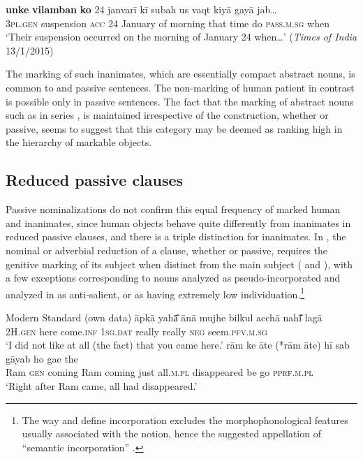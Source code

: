 \documentclass[output=paper]{LSP/langsci}
\begin{document}
\ex
\gll \textbf{unke} \textbf{vilamban} \textbf{ko} 24 janvarī kī subah us vaqt kiyā gayā jab…\\
\textsc{3pl.gen} suspension \textsc{acc} 24 January of morning that time do \textsc{pass.m.sg} when\\
\glt ‘Their suspension occurred on the morning of January 24 when…’ (\emph{Times of India} 13/1/2015)
\z
\z

The marking of such inanimates, which are essentially compact abstract nouns, is common to  and passive sentences. The non-marking of human patient in contrast is possible only in passive sentences. The fact that the marking of abstract nouns such as in series , is maintained irrespective of the construction, whether  or passive, seems to suggest that this category may be deemed as ranking high in the hierarchy of markable objects.

\subsection{Reduced passive clauses} \label{10-mo-sec:3.2}
Passive nominalizations do not confirm this equal frequency of marked human and inanimates, since human objects behave quite differently from inanimates in reduced passive clauses, and there is a triple distinction for inanimates. In , the nominal or adverbial reduction of a clause, whether  or passive, requires the genitive marking of its subject when distinct from the main subject ( and ), with a few exceptions  corresponding to nouns analyzed as pseudo-incorporated \citep{Dayal2011Hindi} and analyzed in \citet{Montaut2012Saillance} as anti-salient, or as having extremely low individuation.\footnote{The way \citet{Dayal2011Hindi} and \citet{Mohanan1994Argument} define incorporation excludes the morphophonological features usually associated with the notion, hence the suggested appellation of “semantic incorporation” \citep{Dayal2011Hindi}.} 

\ea Modern Standard  (own data)
\label{10-mo-ex:22}
\ea \label{10-mo-ex:22a}
\gll āpkā yahā͂ ānā mujhe bilkul acchā nahī͂ lagā\\
 2H.\textsc{gen} here come.\textsc{inf} \textsc{1sg.dat} really really \textsc{neg} seem.\textsc{pfv.m.sg}\\
\glt ‘I did not like at all (the fact) that you came here.’
\ex \label{10-mo-ex:22b}
\gll rām ke āte (*rām āte) hī sab gāyab ho gae the\\
 Ram \textsc{gen} coming Ram coming just all.\textsc{m.pl} disappeared be go \textsc{pprf.m.pl}\\
\glt ‘Right after Ram came, all had disappeared.’
\end{document}
